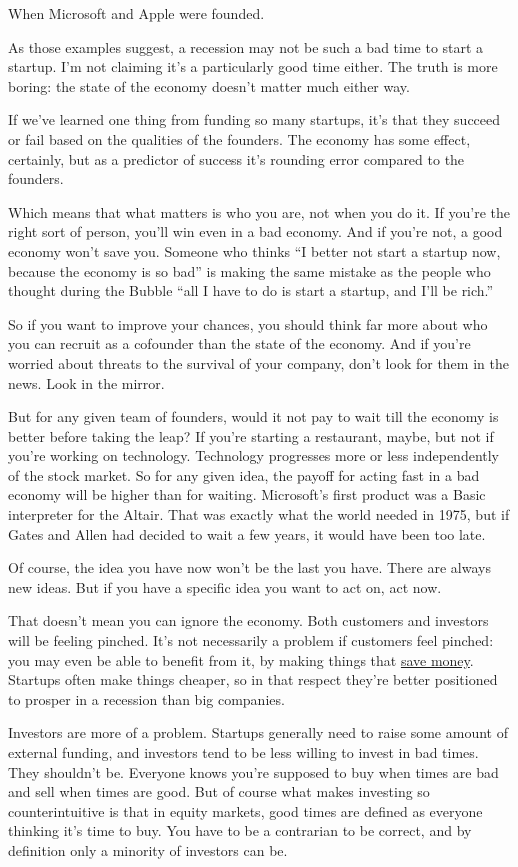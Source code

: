 \documentclass[12pt]{book}
\begin{document}
When Microsoft and Apple were founded.

As those examples suggest, a recession may not be such a bad time to
start a startup. I'm not claiming it's a particularly good time either.
The truth is more boring: the state of the economy doesn't matter much
either way.

If we've learned one thing from funding so many startups, it's that they
succeed or fail based on the qualities of the founders. The economy has
some effect, certainly, but as a predictor of success it's rounding
error compared to the founders.

Which means that what matters is who you are, not when you do it. If
you're the right sort of person, you'll win even in a bad economy. And
if you're not, a good economy won't save you. Someone who thinks ``I
better not start a startup now, because the economy is so bad'' is
making the same mistake as the people who thought during the Bubble
``all I have to do is start a startup, and I'll be rich.''

So if you want to improve your chances, you should think far more about
who you can recruit as a cofounder than the state of the economy. And if
you're worried about threats to the survival of your company, don't look
for them in the news. Look in the mirror.

But for any given team of founders, would it not pay to wait till the
economy is better before taking the leap? If you're starting a
restaurant, maybe, but not if you're working on technology. Technology
progresses more or less independently of the stock market. So for any
given idea, the payoff for acting fast in a bad economy will be higher
than for waiting. Microsoft's first product was a Basic interpreter for
the Altair. That was exactly what the world needed in 1975, but if Gates
and Allen had decided to wait a few years, it would have been too late.

Of course, the idea you have now won't be the last you have. There are
always new ideas. But if you have a specific idea you want to act on,
act now.

That doesn't mean you can ignore the economy. Both customers and
investors will be feeling pinched. It's not necessarily a problem if
customers feel pinched: you may even be able to benefit from it, by
making things that \href{http://bountii.com}{save money}. Startups often
make things cheaper, so in that respect they're better positioned to
prosper in a recession than big companies.

Investors are more of a problem. Startups generally need to raise some
amount of external funding, and investors tend to be less willing to
invest in bad times. They shouldn't be. Everyone knows you're supposed
to buy when times are bad and sell when times are good. But of course
what makes investing so counterintuitive is that in equity markets, good
times are defined as everyone thinking it's time to buy. You have to be
a contrarian to be correct, and by definition only a minority of
investors can be.
\end{document}
